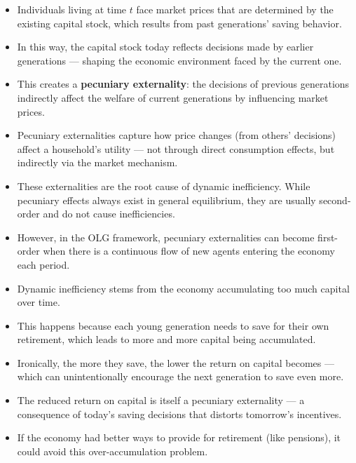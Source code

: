 \documentclass[12pt]{article}
\begin{document}
\begin{itemize}
\item Individuals living at time \( t \) face market prices that are determined by the existing capital stock, which results from past generations' saving behavior.

\item In this way, the capital stock today reflects decisions made by earlier generations — shaping the economic environment faced by the current one.

\item This creates a \textbf{pecuniary externality}: the decisions of previous generations indirectly affect the welfare of current generations by influencing market prices.

\item Pecuniary externalities capture how price changes (from others’ decisions) affect a household’s utility — not through direct consumption effects, but indirectly via the market mechanism.

\item These externalities are the root cause of dynamic inefficiency. While pecuniary effects always exist in general equilibrium, they are usually second-order and do not cause inefficiencies.

\item However, in the OLG framework, pecuniary externalities can become first-order when there is a continuous flow of new agents entering the economy each period.

\item Dynamic inefficiency stems from the economy accumulating too much capital over time.

\item This happens because each young generation needs to save for their own retirement, which leads to more and more capital being accumulated.

\item Ironically, the more they save, the lower the return on capital becomes — which can unintentionally encourage the next generation to save even more.

\item The reduced return on capital is itself a pecuniary externality — a consequence of today's saving decisions that distorts tomorrow’s incentives.

\item If the economy had better ways to provide for retirement (like pensions), it could avoid this over-accumulation problem.


\end{itemize}
\end{document}
